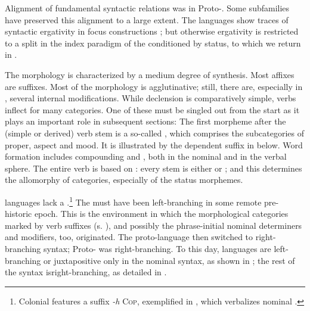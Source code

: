 \documentclass[output=paper]{langsci/langscibook}
\begin{document}
Alignment of fundamental syntactic relations was  in Proto-. Some  subfamilies have preserved this alignment to a large extent. The  languages show traces of syntactic ergativity in focus constructions \citep{Bricker1981}; but otherwise ergativity is restricted to a split in the index paradigm of the   conditioned by status, to which we return in .



The morphology is characterized by a medium degree of synthesis. Most affixes are suffixes. Most of the morphology is agglutinative; still, there are, especially in  , several internal modifications. While declension is comparatively simple, verbs inflect for many  categories. One of these must be singled out from the start as it plays an important role in subsequent sections: The first morpheme after the (simple or derived) verb stem is a so-called , which comprises the subcategories of  proper, aspect and mood. It is illustrated by the dependent  suffix in  below. Word formation includes compounding and , both in the nominal and in the verbal sphere. The entire verb  is based on : every stem is either  or ; and this determines the allomorphy of  categories, especially of the status morphemes.



 languages lack a .\footnote{Colonial   features a suffix \textit{{}-h} \textsc{Cop}, exemplified in , which verbalizes nominal .} The  must have been left-branch\-ing in some remote pre-historic epoch. This is the environment in which the morphological categories marked by verb suffixes (s. ), and possibly the phrase-initial nominal determiners and modifiers, too, originated. The proto-language then switched to right-branching syntax; Proto- was right-branching. To this day,  languages are left-branching or juxtapositive only in the nominal syntax, as shown in ; the rest of the syntax is\largerpage right-branching, as detailed in .\clearpage
\end{document}
